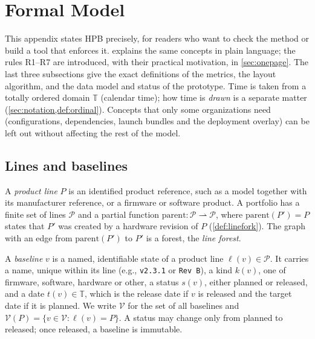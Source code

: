 \section{Formal Model}
\label{app:formal}

This appendix states HPB precisely, for readers who want to check the
method or build a tool that enforces it.  explains the same
concepts in plain language; the rules R1--R7 are introduced, with their
practical motivation, in \cref{sec:onepage}. The last three subsections
give the exact definitions of the metrics, the layout algorithm, and the
data model and status of the prototype. Time is taken from a totally
ordered domain $\mathbb{T}$ (calendar time); how time is \emph{drawn} is a
separate matter (\cref{sec:notation,def:ordinal}). Concepts that only some
organizations need (configurations, dependencies, launch bundles and the
deployment overlay) can be left out without affecting the rest of the
model.

\subsection{Lines and baselines}
\label{app:formal-lines}

\begin{definition}
  \label{def:line}
  A \emph{product line} $P$ is an identified product reference, such as a
  model together with its manufacturer reference, or a firmware or
  software product. A portfolio has a finite set of lines $\mathcal{P}$
  and a partial function
  $\mathrm{parent}\colon \mathcal{P} \rightharpoonup \mathcal{P}$, where
  $\mathrm{parent}(P') = P$ states that $P'$ was created by a hardware
  revision of $P$ (\cref{def:linefork}). The graph with an edge from
  $\mathrm{parent}(P')$ to $P'$ is a forest, the \emph{line forest}.
\end{definition}

\begin{definition}[Baseline]
  \label{def:baseline}
  A \emph{baseline} $v$ is a named, identifiable state of a product line
  $\ell(v) \in \mathcal{P}$. It carries a name, unique within its line
  (e.g., \texttt{v2.3.1} or \texttt{Rev~B}), a kind $k(v)$, one of
  \textsf{firmware}, \textsf{software}, \textsf{hardware} or
  \textsf{other}, a status $s(v)$, either \textsf{planned} or
  \textsf{released}, and a date $t(v) \in \mathbb{T}$, which is the
  release date if $v$ is released and the target date if it is planned.
  We write $\mathcal{V}$ for the set of all baselines and
  $\mathcal{V}(P) = \{v \in \mathcal{V} : \ell(v) = P\}$. A status may
  change only from \textsf{planned} to \textsf{released}; once released,
  a baseline is immutable.
\end{definition}

